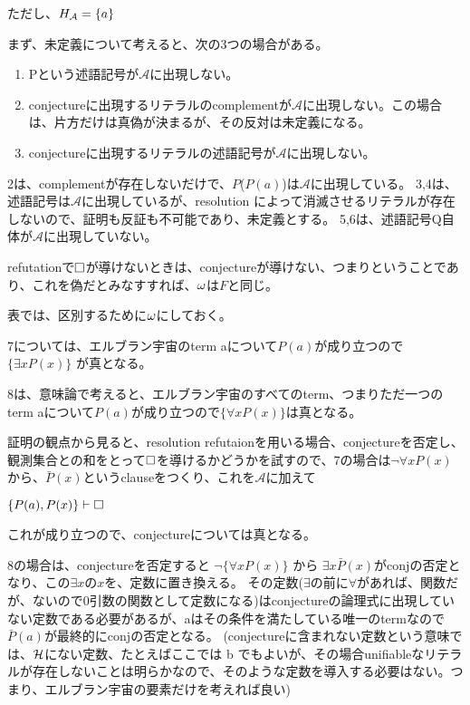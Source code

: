 \documentclass[10pt, oneside]{jarticle}   	%
\begin{document}
ただし、$H_{\mathcal{A}} = \{{a}\}$


まず、未定義について考えると、次の3つの場合がある。
\begin{enumerate}
\item Pという述語記号が$\mathcal{A}$に出現しない。
\item conjectureに出現するリテラルのcomplementが$\mathcal{A}$に出現しない。この場合は、片方だけは真偽が決まるが、その反対は未定義になる。
\item conjectureに出現するリテラルの述語記号が$\mathcal{A}$に出現しない。
\end{enumerate}

2は、complementが存在しないだけで、$P$($P(a)$)は$\mathcal{A}$に出現している。
3,4は、述語記号は$\mathcal{A}$に出現しているが、resolution によって消滅させるリテラルが存在しないので、証明も反証も不可能であり、未定義とする。
5,6は、述語記号Q自体が$\mathcal{A}$に出現していない。

refutationで$\Box$が導けないときは、conjectureが導けない、つまりということであり、これを偽だとみなすすれば、$\omega$は$F$と同じ。

表では、区別するために$\omega$にしておく。

7については、エルブラン宇宙のterm aについて$P(a)$が成り立つので$\{\exists x P(x)\}$ が真となる。

8は、意味論で考えると、エルブラン宇宙のすべてのterm、つまりただ一つのterm aについて$P(a)$が成り立つので$\{\forall x P(x)\}$は真となる。

証明の観点から見ると、resolution refutaionを用いる場合、conjectureを否定し、観測集合との和をとって$\Box$を導けるかどうかを試すので、7の場合は$\neg \forall x P(x)$から、$\bar P(x)$というclauseをつくり、これを$\mathcal{A}$に加えて

$\{P(a), P(x)\} \vdash \Box$ 

これが成り立つので、conjectureについては真となる。

8の場合は、conjectureを否定すると $\neg \{\forall x P(x)\}$ から $\exists x \bar P(x)$がconjの否定となり、この$\exists x$の$x$を、定数に置き換える。
その定数($\exists$の前に$\forall$があれば、関数だが、ないので0引数の関数として定数になる)はconjectureの論理式に出現していない定数である必要があるが、aはその条件を満たしている唯一のtermなので $\bar P(a)$が最終的にconjの否定となる。
(conjectureに含まれない定数という意味では、$\mathcal{H}$にない定数、たとえばここでは b でもよいが、その場合unifiableなリテラルが存在しないことは明らかなので、そのような定数を導入する必要はない。つまり、エルブラン宇宙の要素だけを考えれば良い)
\end{document}
